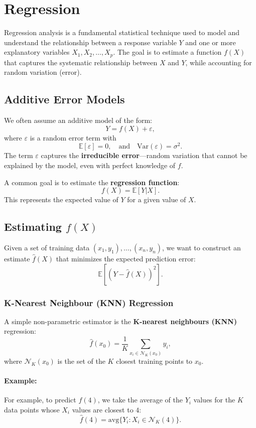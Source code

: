 \section{Regression}

Regression analysis is a fundamental statistical technique used to model and understand the relationship between a response variable \( Y \) and one or more explanatory variables \( X_1, X_2, \ldots, X_p \). The goal is to estimate a function \( f(X) \) that captures the systematic relationship between \( X \) and \( Y \), while accounting for random variation (error).

\subsection{Additive Error Models}

We often assume an additive model of the form:
\[
Y = f(X) + \varepsilon,
\]
where \( \varepsilon \) is a random error term with
\[
\mathbb{E}[\varepsilon] = 0, \quad \text{and} \quad \text{Var}(\varepsilon) = \sigma^2.
\]
The term \( \varepsilon \) captures the \textbf{irreducible error}—random variation that cannot be explained by the model, even with perfect knowledge of \( f \).

A common goal is to estimate the \textbf{regression function}:
\[
f(X) = \mathbb{E}[Y|X].
\]
This represents the expected value of \( Y \) for a given value of \( X \).

\subsection{Estimating \( f(X) \)}

Given a set of training data \((x_1, y_1), \ldots, (x_n, y_n)\), we want to construct an estimate \(\hat{f}(X)\) that minimizes the expected prediction error:
\[
\mathbb{E}\left[(Y - \hat{f}(X))^2\right].
\]

\subsubsection{K-Nearest Neighbour (KNN) Regression}

A simple non-parametric estimator is the \textbf{K-nearest neighbours (KNN)} regression:
\[
\hat{f}(x_0) = \frac{1}{K} \sum_{x_i \in \mathcal{N}_K(x_0)} y_i,
\]
where \(\mathcal{N}_K(x_0)\) is the set of the \(K\) closest training points to \(x_0\).

\paragraph{Example:}
For example, to predict \( f(4) \), we take the average of the \(Y_i\) values for the \(K\) data points whose \(X_i\) values are closest to \(4\):
\[
\hat{f}(4) = \text{avg}\{Y_i : X_i \in \mathcal{N}_K(4)\}.
\]

